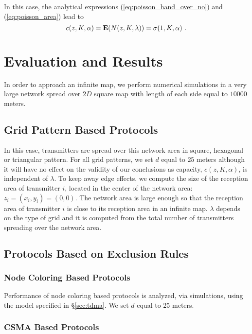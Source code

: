 \documentclass[12pt,english]{article}
\begin{document}
In this case, the analytical expressions (\ref{eq:poisson_hand_over_no}) and (\ref{eq:poisson_area}) lead to 
\begin{equation}
c(z,K,\alpha)={\bf E}(N(z,K,\lambda))=\sigma(1,K,\alpha)~.
\label{eq:poisson_capacity}
\end{equation}

\section{Evaluation and Results}
\label{sec:simulations}

In order to approach an infinite map, we perform numerical simulations in a very large network spread over $2D$ square map with length of each side equal to $10000$ meters.

\subsection{Grid Pattern Based Protocols}

In this case, transmitters are spread over this network area in square, hexagonal or triangular pattern. For all grid patterns, we set $d$ equal to $25$ meters although it will have no effect on the validity of our conclusions as capacity, $c(z,K,\alpha)$, is independent of $\lambda$. To keep away edge effects, we compute the size of the reception area of transmitter $i$, located in the center of the network area: \mbox{$z_{i}=(x_{i},y_{i})=(0,0)$}. The network area is large enough so that the reception area of transmitter $i$ is close to its reception area in an infinite map. $\lambda$ depends on the type of grid and it is computed from the total number of transmitters spreading over the network area.

\subsection{Protocols Based on Exclusion Rules}

\subsubsection{Node Coloring Based Protocols}

Performance of node coloring based protocols is analyzed, via simulations, using the model specified in \S \ref{sec:tdma}. We set $d$ equal to $25$ meters. 

\subsubsection{CSMA Based Protocols}
\end{document}
